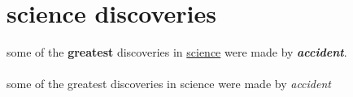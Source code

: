 \documentclass{article}
\begin{document}
	
	\section{science discoveries}
	some of the \textbf{greatest}
	discoveries in \underline{science}
	were made by
	\textbf{\textit{accident}}.
		
		\paragraph{}
		some of the greatest discoveries in science were made by \emph{accident}
		
\end{document}
